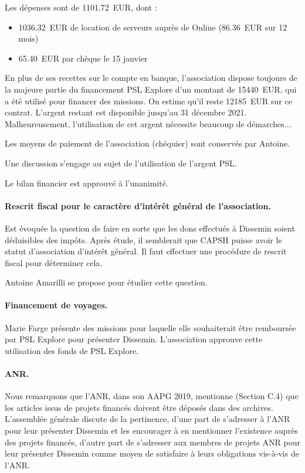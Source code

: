 \documentclass{scrartcl}
\begin{document}
Les dépenses sont de 1101.72~EUR, dont :

\begin{itemize}
  \item 1036.32~EUR de location de serveurs auprès de Online (86.36~EUR sur 12
    mois)
  \item 65.40~EUR par chèque le 15 janvier
\end{itemize}

En plus de ses recettes sur le compte en banque, l'association dispose toujours
de la majeure partie du financement PSL Explore d'un montant de 15440~EUR, qui a
été utilisé pour financer des missions. 
On estime qu'il reste 12185~EUR sur ce contrat.
L'argent restant est disponible jusqu'au
31 décembre 2021. Malheureusement, l'utilisation de cet argent nécessite
beaucoup de démarches...

Les moyens de paiement de l'association (chéquier) sont conservés par Antoine.

Une discussion s'engage au sujet de l'utilisation de l'argent PSL.

Le bilan financier est approuvé à l'unanimité.

\paragraph{Rescrit fiscal pour le caractère d'intérêt général de l'association.}
Est évoquée la question de faire en sorte que les dons effectués à Dissemin
soient déduisibles des impôts. Après étude, il semblerait que CAPSH puisse avoir
le statut d'association d'intérêt général. Il faut effectuer une procédure de
rescrit fiscal pour déterminer cela.

Antoine Amarilli se propose pour étudier cette question.

\paragraph{Financement de voyages.}
Marie Farge présente des missions pour laquelle elle souhaiterait être
remboursée par PSL Explore pour présenter Dissemin. L'association approuve cette
utilisation des fonds de PSL Explore.

\paragraph{ANR.}
Nous remarquons que l'ANR, dans son AAPG 2019, mentionne (Section C.4) que les
articles issus de projets financés doivent être déposés dans des archives.
L'assemblée générale discute de la pertinence, d'une part de s'adresser à l'ANR
pour leur présenter Dissemin et les encourager à en mentionner l'existence
auprès des projets financés, d'autre part de s'adresser aux membres de projets
ANR pour leur présenter Dissemin comme moyen de satisfaire à leurs obligations
vis-à-vis de l'ANR.
\end{document}
